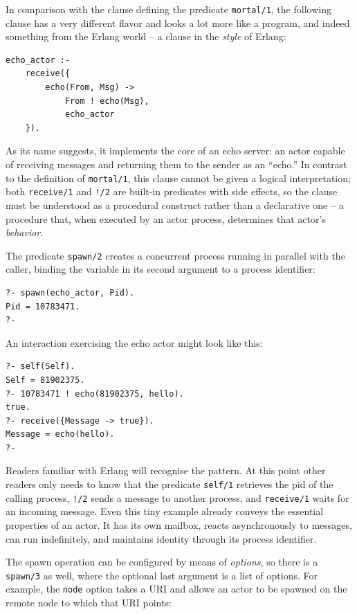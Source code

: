 In comparison with the clause defining the predicate \texttt{mortal/1}, the following clause has a very different flavor and looks a lot more like a program, and indeed something from the Erlang world -- a clause in the \textit{style} of Erlang:

\begin{verbatim}
echo_actor :-                     
    receive({                     
        echo(From, Msg) ->       
            From ! echo(Msg),   
            echo_actor  
    }).        
\end{verbatim}

\noindent As its name suggests, it implements the core of an echo server: an actor capable of  receiving messages and returning them to the sender as an ``echo.'' In contrast to the  definition of \texttt{mortal/1}, this clause cannot be given a logical interpretation; both \texttt{receive/1} and \texttt{!/2} are built-in predicates with side effects, so the clause must be  understood as a procedural construct rather than a declarative one -- a procedure that, when executed by an actor process, determines that actor's \textit{behavior}.

The predicate \texttt{spawn/2} creates a concurrent process running in parallel with the caller, binding the variable in its second argument to a process identifier:

\begin{verbatim}
?- spawn(echo_actor, Pid).
Pid = 10783471.
?-
\end{verbatim}

\noindent An interaction exercising the echo actor might look like this:

\begin{verbatim}
?- self(Self).
Self = 81902375.
?- 10783471 ! echo(81902375, hello).
true.
?- receive({Message -> true}).
Message = echo(hello).
?- 
\end{verbatim}

\noindent Readers familiar with Erlang will recognise the pattern. At this point other readers only needs to know that the predicate \texttt{self/1} retrieves the pid of the calling process, \texttt{!/2} sends a message to another process, and \texttt{receive/1} waits for an incoming message. Even this tiny example already conveys the essential properties of an actor. It has its own mailbox, reacts asynchronously to messages, can run indefinitely, and maintains identity through its process identifier. 

The spawn operation can be configured by means of \textit{options}, so there is a \texttt{spawn/3} as well, where the optional last argument is a list of options. For example, the \texttt{node} option takes a URI and allows an actor to be spawned on the remote node to which that URI points:

